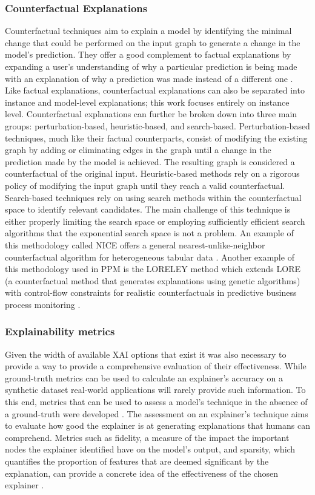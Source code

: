     \subsubsection{Counterfactual Explanations}
        Counterfactual techniques aim to explain a model by identifying the minimal change that could be performed on the input graph to generate a change in the model's prediction. They offer a good complement to factual explanations by expanding a user's understanding of why a particular prediction is being made with an explanation of why a prediction was made instead of a different one \cite{pradoromero2024}.
        Like factual explanations, counterfactual explanations can also be separated into instance and model-level explanations; this work focuses entirely on instance level.
        Counterfactual explanations can further be broken down into three main groups: perturbation-based, heuristic-based, and search-based.
        Perturbation-based techniques, much like their factual counterparts, consist of modifying the existing graph by adding or eliminating edges in the graph until a change in the prediction made by the model is achieved. The resulting graph is considered a counterfactual of the original input.
        Heuristic-based methods rely on a rigorous policy of modifying the input graph until they reach a valid counterfactual.
        Search-based techniques rely on using search methods within the counterfactual space to identify relevant candidates. The main challenge of this technique is either properly limiting the search space or employing sufficiently efficient search algorithms that the exponential search space is not a problem. An example of this methodology called NICE offers a general nearest-unlike-neighbor counterfactual algorithm for heterogeneous tabular data \cite{brughmans2022}.
        Another example of this methodology used in PPM is the LORELEY method which extends LORE (a counterfactual method that generates explanations using genetic algorithms) with control-flow constraints for realistic counterfactuals in predictive business process monitoring \cite{huang2022}.

    \subsubsection{Explainability metrics}
    \label{sec:rw_exp_metrics}
        Given the width of available XAI options that exist it was also necessary to provide a way to provide a comprehensive evaluation of their effectiveness. 
        While ground-truth metrics can be used to calculate an explainer's accuracy on a synthetic dataset real-world applications will rarely provide such information. To this end, metrics that can be used to assess a model's technique in the absence of a ground-truth were developed \cite{stevens2022}. The assessment on an explainer's technique aims to evaluate how good the explainer is at generating explanations that humans can comprehend. Metrics such as fidelity, a measure of the impact the important nodes the explainer identified have on the model's output, and sparsity, which quantifies the proportion of features that are deemed significant by the explanation, can provide a concrete idea of the effectiveness of the chosen explainer \cite{yuan2022}.

